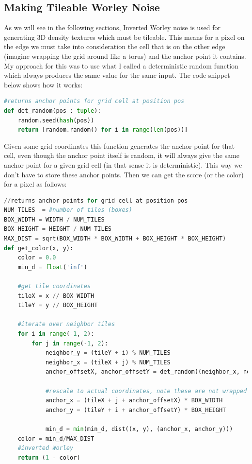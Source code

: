\subsection{Making Tileable Worley Noise}
As we will see in the following sections, Inverted Worley noise is used for generating 3D density textures which must be tileable. This means for a pixel on the edge we must take into consideration the cell that is on the other edge (imagine wrapping the grid around like a torus) and the anchor point it contains. My approach for this was to use what I called a deterministic random function which always produces the same value for the same input. The code snippet below shows how it works:
\begin{lstlisting}[language=Python]
#returns anchor points for grid cell at position pos
def det_random(pos : tuple):
	random.seed(hash(pos))
	return [random.random() for i in range(len(pos))]
\end{lstlisting}

Given some grid coordinates this function generates the anchor point for that cell, even though the anchor point itself is random, it will always give the same anchor point for a given grid cell (in that sense it is deterministic). This way we don't have to store these anchor points. Then we can get the score (or the color) for a pixel as follows:

\begin{lstlisting}[language=Python]
//returns anchor points for grid cell at position pos
NUM_TILES  = #number of tiles (boxes)
BOX_WIDTH = WIDTH / NUM_TILES
BOX_HEIGHT = HEIGHT / NUM_TILES
MAX_DIST = sqrt(BOX_WIDTH * BOX_WIDTH + BOX_HEIGHT * BOX_HEIGHT)
def get_color(x, y):
	color = 0.0
	min_d = float('inf')

	#get tile coordinates
	tileX = x // BOX_WIDTH 
	tileY = y // BOX_HEIGHT

	#iterate over neighbor tiles
	for i in range(-1, 2):
		for j in range(-1, 2):
			neighbor_y = (tileY + i) % NUM_TILES 
			neighbor_x = (tileX + j) % NUM_TILES
			anchor_offsetX, anchor_offsetY = det_random((neighbor_x, neighbor_y))

			#rescale to actual coordinates, note these are not wrapped
			anchor_x = (tileX + j + anchor_offsetX) * BOX_WIDTH
			anchor_y = (tileY + i + anchor_offsetY) * BOX_HEIGHT

			min_d = min(min_d, dist((x, y), (anchor_x, anchor_y)))
	color = min_d/MAX_DIST
	#inverted Worley
	return (1 - color)
			
\end{lstlisting}

